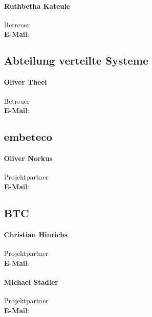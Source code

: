 \paragraph{Ruthbetha Kateule } Betreuer \\
\textbf{E-Mail}: 

\subsection{Abteilung verteilte Systeme}
\paragraph{Oliver Theel} Betreuer \\
\textbf{E-Mail}: 

\subsection{embeteco}
\paragraph{Oliver Norkus} Projektpartner \\
\textbf{E-Mail}: 

\subsection{BTC}
\paragraph{Christian Hinrichs} Projektpartner \\
\textbf{E-Mail}: 

\paragraph{Michael Stadler} Projektpartner \\
\textbf{E-Mail}: 